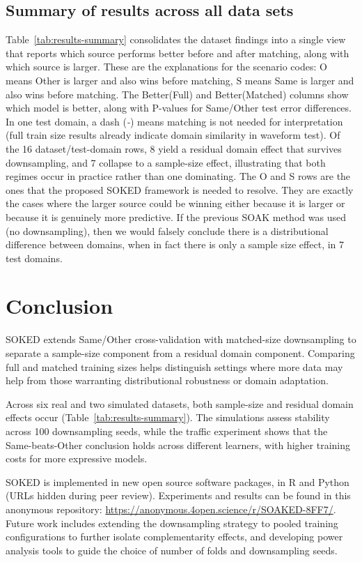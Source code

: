 \documentclass[twoside]{article}
\begin{document}
\subsection{Summary of results across all data sets}
Table~\ref{tab:results-summary} consolidates the dataset findings into a single view that reports which source performs better before and after matching, along with which source is larger.
These are the explanations for the scenario codes: O means Other is larger and also wins before matching, S means Same is larger and also wins before matching.
The Better(Full) and Better(Matched) columns show which model is better, along with P-values for Same/Other test error differences.
In one test domain, a dash (\emph{-}) means matching is not needed for interpretation (full train size results already indicate domain similarity in waveform test).
Of the 16 dataset/test-domain rows, 8 yield a residual domain effect that survives downsampling, and 7 collapse to a sample-size effect, illustrating that both regimes occur in practice rather than one dominating.
The O and S rows are the ones that the proposed SOKED framework is needed to resolve.
They are exactly the cases where the larger source could be winning either because it is larger or because it is genuinely more predictive.
If the previous SOAK method \cite{hocking2026} was used (no downsampling), then we would falsely conclude there is a distributional difference between domains, when in fact there is only a sample size effect, in 7 test domains.


\section{Conclusion}
SOKED extends Same/Other cross-validation with matched-size downsampling to separate a sample-size component from a residual domain component. Comparing full and matched training sizes helps distinguish settings where more data may help from those warranting distributional robustness or domain adaptation.

Across six real and two simulated datasets, both sample-size and residual domain effects occur (Table~\ref{tab:results-summary}). The simulations assess stability across 100 downsampling seeds, while the traffic experiment shows that the Same-beats-Other conclusion holds across different learners, with higher training costs for more expressive models.


SOKED is implemented in new open source software packages, in R and Python (URLs hidden during peer review).
Experiments and results can be found in this anonymous repository: \url{https://anonymous.4open.science/r/SOAKED-8FF7/}.
Future work includes extending the downsampling strategy to pooled training configurations to further isolate complementarity effects, and developing power analysis tools to guide the choice of number of folds and downsampling seeds.
\end{document}
